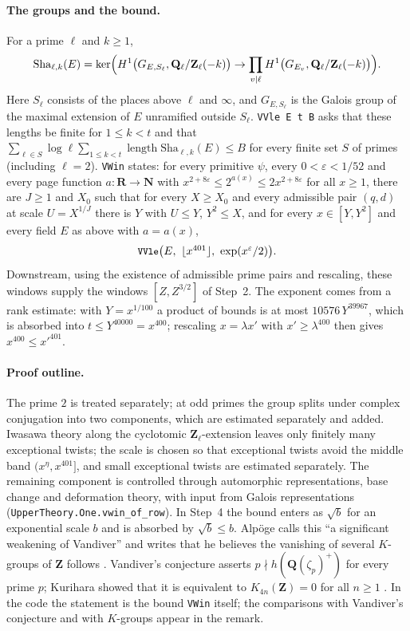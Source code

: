 \documentclass[11pt]{article}
\newcommand{\Lean}[1]{\texttt{\small #1}}
\newcommand{\Q}{\mathbf{Q}}
\newcommand{\Z}{\mathbf{Z}}
\newcommand{\Sha}{\mathrm{Sha}}
\begin{document}
\paragraph{The groups and the bound.} For a prime $\ell$ and $k\ge1$,
\[
\Sha_{\ell,k}(E)=\ker\Bigl(H^1\bigl(G_{E,S_\ell},\Q_\ell/\Z_\ell(-k)\bigr)\to\prod_{v\mid\ell}H^1\bigl(G_{E_v},\Q_\ell/\Z_\ell(-k)\bigr)\Bigr).
\]
Here $S_\ell$ consists of the places above $\ell$ and $\infty$, and $G_{E,S_\ell}$ is the Galois group of the maximal extension of $E$ unramified outside $S_\ell$. \Lean{VVle E t B} asks that these lengths be finite for $1\le k<t$ and that $\sum_{\ell\in S}\log\ell\sum_{1\le k<t}\operatorname{length}\Sha_{\ell,k}(E)\le B$ for every finite set $S$ of primes (including $\ell=2$). \Lean{VWin} states: for every primitive $\psi$, every $0<\varepsilon<1/52$ and every page function $a:\mathbf R\to\mathbf N$ with $x^{2+8\varepsilon}\le2^{a(x)}\le2x^{2+8\varepsilon}$ for all $x\ge1$, there are $J\ge1$ and $X_0$ such that for every $X\ge X_0$ and every admissible pair $(q,d)$ at scale $U=X^{1/J}$ there is $Y$ with $U\le Y$, $Y^2\le X$, and for every $x\in[Y,Y^2]$ and every field $E$ as above with $a=a(x)$,
\[
\textstyle\text{\Lean{VVle}}\bigl(E,\ \lfloor x^{401}\rfloor,\ \exp(x^{\varepsilon}/2)\bigr).
\]
Downstream, using the existence of admissible prime pairs and rescaling, these windows supply the windows $[Z,Z^{3/2}]$ of Step~2. The exponent comes from a rank estimate: with $Y=x^{1/100}$ a product of bounds is at most $10576\,Y^{39967}$, which is absorbed into $t\le Y^{40000}=x^{400}$; rescaling $x=\lambda x'$ with $x'\ge\lambda^{400}$ then gives $x^{400}\le x'^{401}$.

\paragraph{Proof outline.} The prime $2$ is treated separately; at odd primes the group splits under complex conjugation into two components, which are estimated separately and added. Iwasawa theory along the cyclotomic $\Z_\ell$-extension leaves only finitely many exceptional twists; the scale is chosen so that exceptional twists avoid the middle band $(x^\eta,x^{401}]$, and small exceptional twists are estimated separately. The remaining component is controlled through automorphic representations, base change and deformation theory, with input from Galois representations (\Lean{UpperTheory.One.vwin\_of\_row}). In Step~4 the bound enters as $\sqrt b$ for an exponential scale $b$ and is absorbed by $\sqrt b\le b$. Alp\"oge calls this ``a significant weakening of Vandiver'' and writes that he believes the vanishing of several $K$-groups of $\Z$ follows \cite{alpoge}. Vandiver's conjecture asserts $p\nmid h(\Q(\zeta_p)^+)$ for every prime $p$; Kurihara showed that it is equivalent to $K_{4n}(\Z)=0$ for all $n\ge1$ \cite{kurihara}. In the code the statement is the bound \Lean{VWin} itself; the comparisons with Vandiver's conjecture and with $K$-groups appear in the remark.
\end{document}
